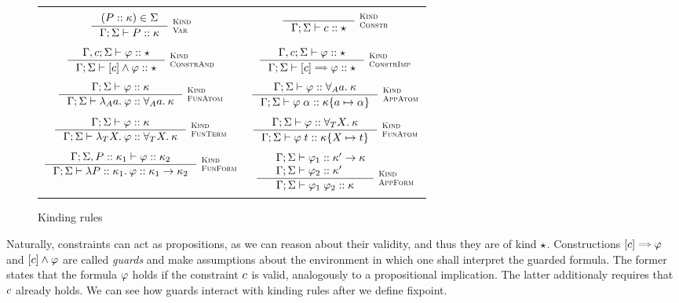 \documentclass[english, mgr]{iithesis}
\renewcommand{\it}[1]{\textit{#1}}
\newcommand{\scbrk}[2]{\myatop{\textsc{#1}}{\textsc{#2}}}
\begin{document}
\begin{figure}[htpb]
  \begin{tabularx}{\textwidth}{|CC|}
    \hline & \\
     $\inference{
      (\propv \ofkind \kind) \in  \kEnv
  }{
    \cEnv; \kEnv \vdash \propv \ofkind \kind
  }\:\scbrk{Kind}{Var}
  $ &
     $\inference{
  }{
    \cEnv; \kEnv \vdash \fConstr{\constr} \ofkind \kProp
  }\:\scbrk{Kind}{Constr}
  $ \\ & \\ $
  \inference{
    \cEnv,\constr; \kEnv \vdash \formphi \ofkind \kProp
  }{
    \cEnv; \kEnv \vdash \fCAnd{\constr} \formphi \ofkind \kProp
  }\:\scbrk{Kind}{ConstrAnd}
  $ & $
  \inference{
    \cEnv,\constr; \kEnv \vdash \formphi \ofkind \kProp
  }{
    \cEnv; \kEnv \vdash \fCImp{\constr} \formphi \ofkind \kProp
  }\:\scbrk{Kind}{ConstrImp}$ \\ & \\
    $\inference{
      \cEnv; \kEnv \vdash \formphi \ofkind \kind
    }{
      \cEnv; \kEnv \vdash \fLamAtom{\atomv} \formphi \ofkind \kForallAtom{\atomv}\kind
    }\:\scbrk{Kind}{FunAtom}$
    &
    $\inference{
      \cEnv;\kEnv\vdash \formphi \ofkind \kForallAtom{\atomv}\kind
    }{
      \cEnv;\kEnv\vdash \formphi \fAppAtom{\atomexp} \ofkind \kind \subst{\atomv}{\atomexp}
    }\:\scbrk{Kind}{AppAtom}$
    \\ & \\
    $\inference{
      \cEnv; \kEnv \vdash \formphi \ofkind \kind
    }{
      \cEnv; \kEnv \vdash \fLamTerm{\termv} \formphi \ofkind \kForallTerm{\termv}\kind
    }\:\scbrk{Kind}{FunTerm}$
    &
    $\inference{
      \cEnv;\kEnv\vdash \formphi \ofkind \kForallTerm{\termv}\kind
    }{
      \cEnv;\kEnv\vdash \formphi \fAppTerm{\term} \ofkind \kind\subst{\termv}{\term}
    }\:\scbrk{Kind}{FunAtom}$
    \\ & \\
    $\inference{
      \cEnv; \kEnv, \propv \ofkind \kind_1 \vdash \formphi \ofkind \kind_2
    }{
      \cEnv; \kEnv \vdash \fLamForm{\propv}{\kind_1} \formphi \ofkind \kind_1 \karrow \kind_2
    }\:\scbrk{Kind}{FunForm}$
    &
    $\inference{
      \quad \cEnv; \kEnv \vdash \formphi_1 \ofkind \kind' \karrow \kind
      \\
      \quad \cEnv; \kEnv \vdash \formphi_2 \ofkind \kind' \hfill
    }{
      \cEnv;\kEnv\vdash \formphi_1 \fApp \formphi_2 \ofkind \kind
    }\:\scbrk{Kind}{AppForm}$
    \\ & \\
    \hline
\end{tabularx}
  \caption{Kinding rules}
  \label{fig:kinding}
\end{figure}
Naturally, constraints can act as propositions, as we can reason about their
validity, and thus they are of kind $\star$.
Constructions $\fCImp{\constr} \formphi$ and $[c]\wedge \varphi$
are called \it{guards} and make assumptions about the environment in which
one shall interpret the guarded formula.
The former states that the formula $\varphi$ holds if the constraint $c$ is valid,
analogously to a propositional implication.
The latter additionaly requires that $c$ already holds.
We can see how guards interact with kinding rules after we define fixpoint.
\end{document}
